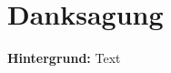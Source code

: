 %
%
\thispagestyle{empty} 
\let\raggedsection\centering 
\chapter*{Danksagung}\label{danksagung}
\let\raggedsection\raggedright 

\textbf{Hintergrund:} Text